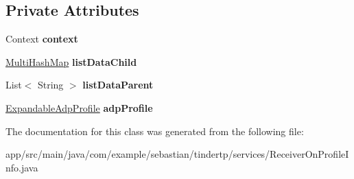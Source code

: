 \subsection*{Private Attributes}
\begin{DoxyCompactItemize}
\item 
Context {\bfseries context}\hypertarget{classcom_1_1example_1_1sebastian_1_1tindertp_1_1services_1_1ReceiverOnProfileInfo_a58de110f0b905eff3a7994239e4abd85}{}\label{classcom_1_1example_1_1sebastian_1_1tindertp_1_1services_1_1ReceiverOnProfileInfo_a58de110f0b905eff3a7994239e4abd85}

\item 
\hyperlink{classcom_1_1example_1_1sebastian_1_1tindertp_1_1commonTools_1_1MultiHashMap}{Multi\+Hash\+Map} {\bfseries list\+Data\+Child}\hypertarget{classcom_1_1example_1_1sebastian_1_1tindertp_1_1services_1_1ReceiverOnProfileInfo_a3aec67560824d8459251ceea2c2b4155}{}\label{classcom_1_1example_1_1sebastian_1_1tindertp_1_1services_1_1ReceiverOnProfileInfo_a3aec67560824d8459251ceea2c2b4155}

\item 
List$<$ String $>$ {\bfseries list\+Data\+Parent}\hypertarget{classcom_1_1example_1_1sebastian_1_1tindertp_1_1services_1_1ReceiverOnProfileInfo_a08a466f4a49aa833f003edd2cd9feba1}{}\label{classcom_1_1example_1_1sebastian_1_1tindertp_1_1services_1_1ReceiverOnProfileInfo_a08a466f4a49aa833f003edd2cd9feba1}

\item 
\hyperlink{classcom_1_1example_1_1sebastian_1_1tindertp_1_1ExpandableAdpProfile}{Expandable\+Adp\+Profile} {\bfseries adp\+Profile}\hypertarget{classcom_1_1example_1_1sebastian_1_1tindertp_1_1services_1_1ReceiverOnProfileInfo_a269944bcb84fdce8bff23e0618c2f163}{}\label{classcom_1_1example_1_1sebastian_1_1tindertp_1_1services_1_1ReceiverOnProfileInfo_a269944bcb84fdce8bff23e0618c2f163}

\end{DoxyCompactItemize}


The documentation for this class was generated from the following file\+:\begin{DoxyCompactItemize}
\item 
app/src/main/java/com/example/sebastian/tindertp/services/Receiver\+On\+Profile\+Info.\+java\end{DoxyCompactItemize}
